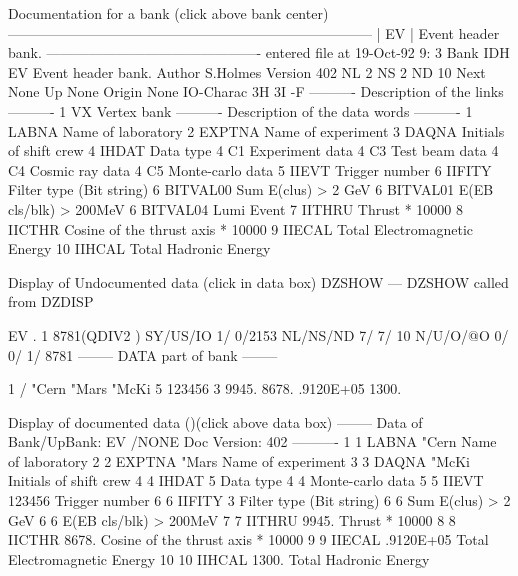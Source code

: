 \begin{XMPt}{Documentation for a bank (click above bank center)}
------------------------------------------------------------------------------
| EV   | Event header bank.
 ---------------------------------------------- entered file at 19-Oct-92  9: 3
 Bank IDH  EV       Event header bank.
 Author             S.Holmes
 Version            402
 NL               2
 NS               2
 ND              10
 Next      None
 Up        None
 Origin    None
 IO-Charac          3H 3I -F
              ---------- Description of the links  ----------
 1         VX       Vertex bank
              ---------- Description of the data words   ----------
 1         LABNA    Name of laboratory
 2         EXPTNA   Name of experiment
 3         DAQNA    Initials of shift crew
 4         IHDAT    Data type
 4         C1       Experiment data
 4         C3       Test beam data
 4         C4       Cosmic ray data
 4         C5       Monte-carlo data
 5         IIEVT    Trigger number
 6         IIFITY   Filter type (Bit string)
 6         BITVAL00 Sum E(clus) > 2 GeV
 6         BITVAL01 E(EB cls/blk) > 200MeV
 6         BITVAL04 Lumi Event
 7         IITHRU   Thrust * 10000
 8         IICTHR   Cosine of the thrust axis * 10000
 9         IIECAL   Total Electromagnetic Energy
 10        IIHCAL   Total Hadronic Energy
\end{XMPt}
 
\finalnewpage
 
\begin{XMPt}{Display of Undocumented data (click in data box)}
 DZSHOW ---  DZSHOW called from DZDISP
 
EV  .     1     8781(QDIV2   ) SY/US/IO    1/    0/2153 
NL/NS/ND    7/    7/      10 N/U/O/@O       0/       0/       1/
   8781
 --------  DATA part of bank  --------
 
       1 /       "Cern       "Mars       "McKi           5      123456
                         3   9945.       8678.       .9120E+05   1300.
\end{XMPt}
 
\bigskip
 
\begin{XMPt}{Display of documented data ()(click above data box)}
 -------- Data of Bank/UpBank: EV  /NONE Doc Version: 402 ----------
     1    1  LABNA          "Cern  Name of laboratory
     2    2  EXPTNA         "Mars  Name of experiment
     3    3  DAQNA          "McKi  Initials of shift crew
     4    4  IHDAT              5  Data type
     4    4                        Monte-carlo data
     5    5  IIEVT         123456  Trigger number
     6    6  IIFITY             3  Filter type (Bit string)
     6    6                        Sum E(clus) > 2 GeV
     6    6                        E(EB cls/blk) > 200MeV
     7    7  IITHRU     9945.      Thrust * 10000
     8    8  IICTHR     8678.      Cosine of the thrust axis * 10000
     9    9  IIECAL     .9120E+05  Total Electromagnetic Energy
    10   10  IIHCAL     1300.      Total Hadronic Energy
\end{XMPt}
 
